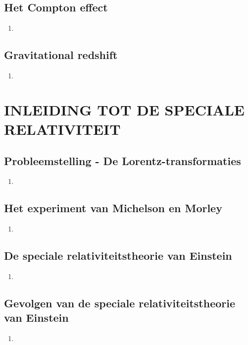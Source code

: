\documentclass[12pt]{article}
\begin{document}
    \subsection{Het Compton effect}
    \begin{enumerate}
        \item 
    \end{enumerate}
    \subsection{Gravitational redshift}
    \begin{enumerate}
        \item 
    \end{enumerate}



    \section{INLEIDING TOT DE SPECIALE RELATIVITEIT}
    \subsection{Probleemstelling - De Lorentz-transformaties}
    \begin{enumerate}
        \item 
    \end{enumerate}
    \subsection{Het experiment van Michelson en Morley}
    \begin{enumerate}
        \item 
    \end{enumerate}
    \subsection{De speciale relativiteitstheorie van Einstein}
    \begin{enumerate}
        \item 
    \end{enumerate}
    \subsection{Gevolgen van de speciale relativiteitstheorie van Einstein}
    \begin{enumerate}
        \item 
    \end{enumerate}
\end{document}

